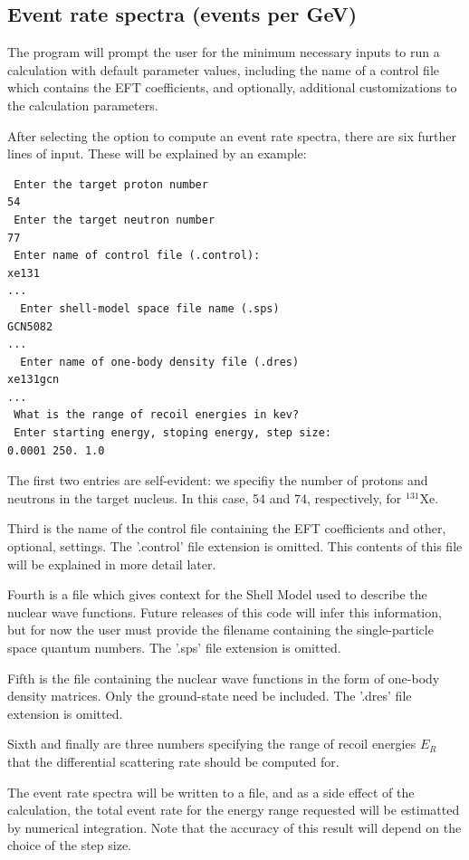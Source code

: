 \documentclass[12pt]{article}
\begin{document}
\subsection{Event rate spectra (events per GeV)}
The program will prompt the user for 
the minimum necessary inputs to run a calculation with default parameter 
values, including the name of a control file which contains the EFT
coefficients, and optionally, additional customizations to the calculation
parameters.

After selecting the option to compute an event rate spectra, there are six
further lines of input. These will be explained by an example:

\begin{verbatim}
 Enter the target proton number
54
 Enter the target neutron number 
77 
 Enter name of control file (.control):
xe131
...
  Enter shell-model space file name (.sps)
GCN5082
...
  Enter name of one-body density file (.dres)
xe131gcn
...
 What is the range of recoil energies in kev?
 Enter starting energy, stoping energy, step size:
0.0001 250. 1.0
\end{verbatim}

The first two entries are self-evident: we specifiy the number of protons and
neutrons in the target nucleus. In this case, 54 and 74, respectively, for
$^{131}$Xe.

Third is the name of the control file containing the EFT coefficients and other,
optional, settings. The '.control' file extension is omitted. This contents of
this file will be explained in more detail later.

Fourth is a file which gives context for the Shell Model used to describe the
nuclear wave functions. Future releases of this code will infer this
information, but for now the user must provide the filename containing the
single-particle space quantum numbers. The '.sps' file extension is omitted. 

Fifth is the file containing the nuclear wave functions in the form of one-body
density matrices. Only the ground-state need be included. The '.dres' file
extension is omitted. 

Sixth and finally are three numbers specifying the range of recoil energies
$E_R$ that the differential scattering rate should be computed for.

The event rate spectra will be written to a file, and as a side effect of the
calculation, the total event rate for the energy range requested will be
estimatted by numerical integration. Note that the accuracy of this result will
depend on the choice of the step size.
\end{document}

